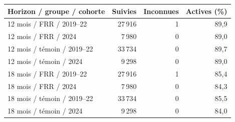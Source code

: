 \begin{tabularx}{\linewidth}{Xrrr}
\toprule
Horizon / groupe / cohorte & Suivies & Inconnues & Actives (\%) \\
\midrule
12 mois / FRR / 2019–22 & 27\,916 & 1 & 89,9 \\
12 mois / FRR / 2024 & 7\,980 & 0 & 89,0 \\
12 mois / témoin / 2019–22 & 33\,734 & 0 & 89,7 \\
12 mois / témoin / 2024 & 9\,298 & 0 & 89,0 \\
18 mois / FRR / 2019–22 & 27\,916 & 1 & 85,4 \\
18 mois / FRR / 2024 & 7\,980 & 0 & 84,3 \\
18 mois / témoin / 2019–22 & 33\,734 & 0 & 85,5 \\
18 mois / témoin / 2024 & 9\,298 & 0 & 84,0 \\
\bottomrule
\end{tabularx}
